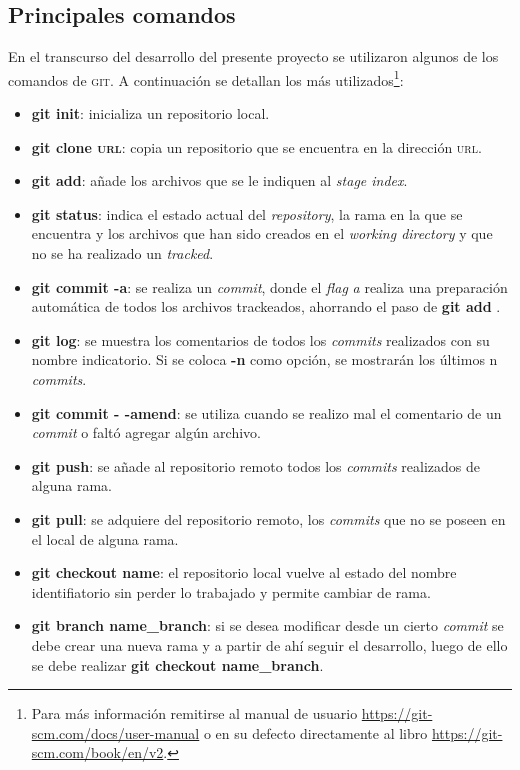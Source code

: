 \newpage
\subsection{Principales comandos}

En el transcurso del desarrollo del presente proyecto se utilizaron algunos de los comandos de \textsc{git}. A continuación se detallan los más utilizados\footnote{\label{nota1}Para más información remitirse al manual de usuario \url{https://git-scm.com/docs/user-manual} o en su defecto directamente al libro \url{https://git-scm.com/book/en/v2}.}: 

\begin{itemize}
	\item \textbf{git init}: inicializa un repositorio local.
	\item \textbf{git clone \textsc{url}}: copia un repositorio que se encuentra en la dirección \textsc{url}.
	\item \textbf{git add}: añade los archivos que se le indiquen al \textit{stage index}. 
	\item \textbf{git status}: indica el estado actual del \textit{repository}, la rama en la que se encuentra y los archivos que han sido creados en el \textit{working directory} y que no se ha realizado un \textit{tracked}.
	\item \textbf{git commit -a}: se realiza un \textit{commit}, donde el \textit{flag} \textit{a} realiza una preparación automática de todos los archivos trackeados, ahorrando el paso de \textbf{git add} \cite{user:2020:git}.  
	\item \textbf{git log}: se muestra los comentarios de todos los \textit{commits} realizados con su nombre indicatorio. Si se coloca \textbf{-n} como opción, se mostrarán los últimos n \textit{commits}.
	\item \textbf{git commit - -amend}: se utiliza cuando se realizo mal el comentario de un \textit{commit} o faltó agregar algún archivo.
	\item \textbf{git push}: se añade al repositorio remoto todos los \textit{commits} realizados de alguna rama.
	\item \textbf{git pull}: se adquiere del repositorio remoto, los \textit{commits} que no se poseen en el local de alguna rama.
	\item \textbf{git checkout name}: el repositorio local vuelve al estado del nombre identifiatorio sin perder lo trabajado y permite cambiar de rama.
	\item \textbf{git branch name\_branch}: si se desea modificar desde un cierto \textit{commit} se debe crear una nueva rama y a partir de ahí seguir el desarrollo, luego de ello se debe realizar \textbf{git checkout name\_branch}.

\end{itemize}
